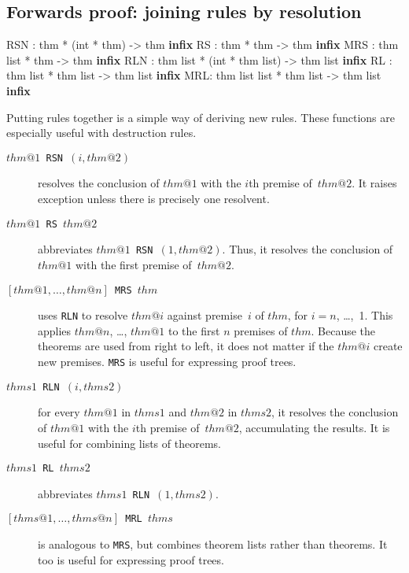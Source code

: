 \subsection{Forwards proof: joining rules by resolution}
\begin{ttbox} 
RSN : thm * (int * thm) -> thm                 \hfill{\bf infix}
RS  : thm * thm -> thm                         \hfill{\bf infix}
MRS : thm list * thm -> thm                    \hfill{\bf infix}
RLN : thm list * (int * thm list) -> thm list  \hfill{\bf infix}
RL  : thm list * thm list -> thm list          \hfill{\bf infix}
MRL: thm list list * thm list -> thm list      \hfill{\bf infix}
\end{ttbox}
Putting rules together is a simple way of deriving new rules.  These
functions are especially useful with destruction rules.
\begin{description}
\item[\tt$thm@1$ RSN $(i,thm@2)$]  
resolves the conclusion of $thm@1$ with the $i$th premise of~$thm@2$.  It
raises exception  unless there is precisely one resolvent.

\item[\tt$thm@1$ RS $thm@2$]  
abbreviates \hbox{\tt$thm@1$ RSN $(1,thm@2)$}.  Thus, it resolves the
conclusion of $thm@1$ with the first premise of~$thm@2$.

\item[\tt {$[thm@1,\ldots,thm@n]$} MRS $thm$]  
  uses {\tt RLN} to resolve $thm@i$ against premise~$i$ of $thm$, for
  $i=n$, \ldots,~1.  This applies $thm@n$, \ldots, $thm@1$ to the first $n$
  premises of $thm$.  Because the theorems are used from right to left, it
  does not matter if the $thm@i$ create new premises.  {\tt MRS} is useful
  for expressing proof trees.

\item[\tt$thms1$ RLN $(i,thms2)$]  
for every $thm@1$ in $thms1$ and $thm@2$ in $thms2$, it resolves the
conclusion of $thm@1$ with the $i$th premise of~$thm@2$, accumulating the
results.  It is useful for combining lists of theorems.

\item[\tt$thms1$ RL $thms2$]  
abbreviates \hbox{\tt$thms1$ RLN $(1,thms2)$}. 

\item[\tt {$[thms@1,\ldots,thms@n]$} MRL $thms$]  
is analogous to {\tt MRS}, but combines theorem lists rather than theorems.
It too is useful for expressing proof trees.
\end{description}


